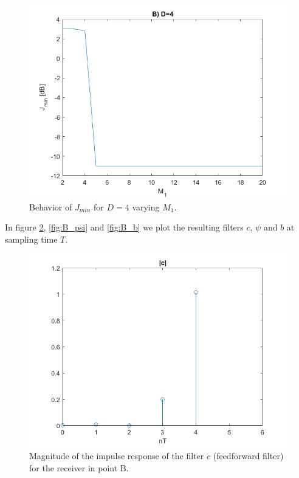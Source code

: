 \documentclass[a4paper,11.5pt]{article}
\begin{document}
\begin{figure}[H]
	\begin{center}   
		\includegraphics[width=\textwidth]{figs/B_Jmin.png} 
		\caption{Behavior of $J_{min}$ for $D=4$ varying $M_1$.}
		\label{fig:B_Jmin}
	\end{center}
\end{figure}


 In figure \ref{fig:B_c}, \ref{fig:B_psi} and \ref{fig:B_b} we plot the resulting filters $c$, $\psi$ and $b$ at sampling time $T$. 

\begin{figure}[H]
	\begin{center}   
		\includegraphics[width=\textwidth]{figs/B_c.png} 
		\caption{Magnitude of the impulse response of the filter $c$ (feedforward filter) for the receiver in point B.}
		\label{fig:B_c}
	\end{center}
\end{figure}
\end{document}
